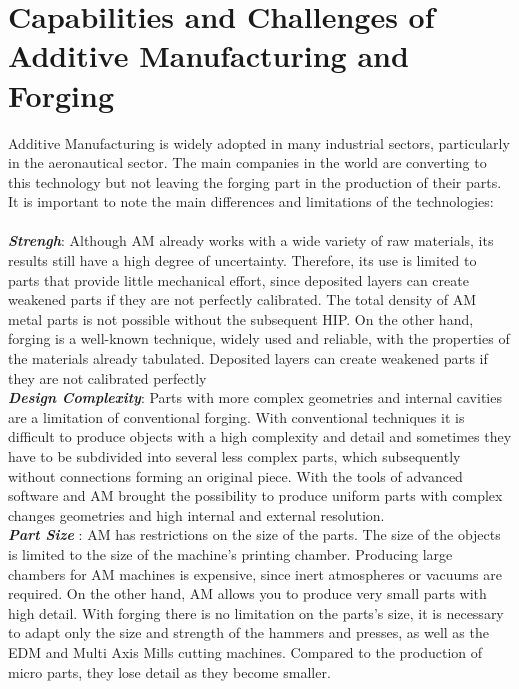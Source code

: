 \section{Capabilities and Challenges of Additive Manufacturing and Forging}

Additive Manufacturing is widely adopted in many industrial sectors, particularly in the aeronautical sector. The main companies in the world are converting to this technology but not leaving the forging part in the production of their parts. It is important to note the main differences and limitations of the technologies:\\
\vspace{20}\\
 \textbf{\emph{Strengh}}: Although \ac{AM} already works with a wide variety of raw materials, its results still have a high degree of uncertainty. Therefore, its use is limited to parts that provide little mechanical effort, since deposited layers can create weakened parts if they are not perfectly calibrated\cite{AMD}. The total density of AM metal parts is not possible without the subsequent \ac{HIP}. On the other hand, forging is a well-known technique, widely used and reliable, with the properties of the materials already tabulated. Deposited layers can create weakened parts if they are not calibrated perfectly
 \vspace{20} \\
 \textbf{\emph{Design Complexity}}: Parts with more complex geometries and internal cavities are a limitation of conventional forging. With conventional techniques it is difficult to produce objects with a high complexity and detail and sometimes they have to be subdivided into several less complex parts, which subsequently without connections forming an original piece\cite{he2007transport}.
With the tools of advanced software and AM brought the possibility to produce uniform parts with complex changes geometries and high internal and external resolution\cite{toyserkani2004laser}.
 \vspace{20}\\
 \textbf{\emph{Part Size }}: AM has restrictions on the size of the parts. The size of the objects is limited to the size of the machine's printing chamber. Producing large chambers for AM machines is expensive, since inert atmospheres or vacuums are required. On the other hand, AM allows you to produce very small parts with high detail\cite{saboori2017overview}.
With forging there is no limitation on the parts's size, it is necessary to adapt only the size and strength of the hammers and presses, as well as the EDM and Multi Axis Mills cutting machines. Compared to the production of micro parts, they lose detail as they become smaller\cite{saboori2017overview}\cite{frazier2014metal}.
